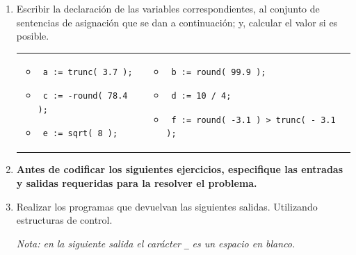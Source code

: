 \documentclass[a4paper,10pt]{article}
\begin{document}
\begin{enumerate}
\item Escribir la declaraci\'on de las variables correspondientes, al conjunto de sentencias de asignaci\'on que se dan a continuaci\'on; y, calcular el valor si es posible.

\begin{tabular}{p{} p{}}
    \begin{itemize}
        \item[a-] \begin{verbatim} a := trunc( 3.7 );\end{verbatim}
        \item[c-] \begin{verbatim} c := -round( 78.4 );\end{verbatim}
        \item[e-] \begin{verbatim} e := sqrt( 8 );\end{verbatim}
    \end{itemize}
&
    \begin{itemize}
        \item[b-] \begin{verbatim} b := round( 99.9 );\end{verbatim}
        \item[d-] \begin{verbatim} d := 10 / 4;\end{verbatim}
        \item[f-] \begin{verbatim} f := round( -3.1 ) > trunc( - 3.1 );\end{verbatim}
    \end{itemize}
\\
\end{tabular}

\item[] \begin{large}\textbf{Antes de codificar los siguientes ejercicios, especifique las entradas y salidas requeridas para la resolver el problema.} \end{large}

\item Realizar los programas que devuelvan las siguientes salidas. Utilizando estructuras de control.
\begin{small} \emph{Nota: en la siguiente salida el car\'acter} \verb=_= \emph{es un espacio en blanco.}\end{small}


\end{enumerate}
\end{document}
